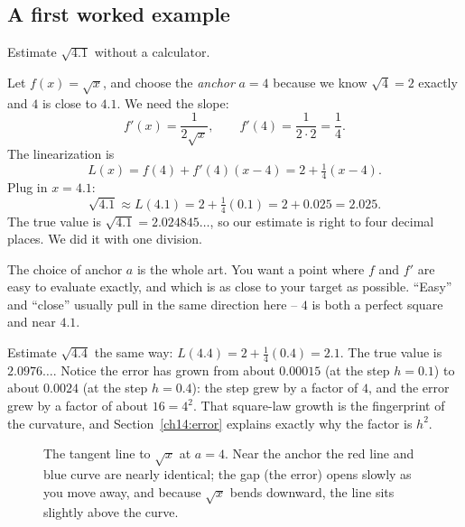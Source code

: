 \subsection{A first worked example}

\begin{example}
\label{ch14:ex-sqrt}
Estimate $\sqrt{4.1}$ without a calculator.

Let $f(x)=\sqrt{x}$, and choose the \emph{anchor} $a=4$ because we know
$\sqrt{4}=2$ exactly and $4$ is close to $4.1$. We need the slope:
\[
f'(x) = \frac{1}{2\sqrt{x}}, \qquad f'(4) = \frac{1}{2\cdot 2} = \frac14.
\]
The linearization is
\[
L(x) = f(4) + f'(4)(x-4) = 2 + \tfrac14 (x-4).
\]
Plug in $x=4.1$:
\[
\sqrt{4.1} \approx L(4.1) = 2 + \tfrac14 (0.1) = 2 + 0.025 = 2.025.
\]
The true value is $\sqrt{4.1} = 2.024845\ldots$, so our estimate is right to four
decimal places. We did it with one division.
\end{example}

The choice of anchor $a$ is the whole art. You want a point where $f$ and $f'$
are easy to evaluate exactly, and which is as close to your target as possible.
``Easy'' and ``close'' usually pull in the same direction here -- $4$ is both a
perfect square and near $4.1$.

\begin{labbox}
Estimate $\sqrt{4.4}$ the same way: $L(4.4) = 2 + \tfrac14(0.4) = 2.1$. The true
value is $2.0976\ldots$. Notice the error has grown from about $0.00015$ (at the
step $h=0.1$) to about $0.0024$ (at the step $h=0.4$): the step grew by a factor
of $4$, and the error grew by a factor of about $16=4^2$. That square-law growth
is the fingerprint of the curvature, and Section~\ref{ch14:error} explains
exactly why the factor is $h^2$.
\end{labbox}

\begin{figure}[H]
\centering
{}
\caption{The tangent line to $\sqrt{x}$ at $a=4$. Near the anchor the red line
and blue curve are nearly identical; the gap (the error) opens slowly as you move
away, and because $\sqrt{x}$ bends downward, the line sits slightly above the
curve.}
\label{ch14:fig-sqrt}
\end{figure}

